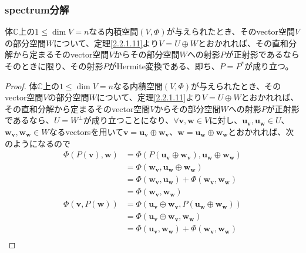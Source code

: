 \documentclass[dvipdfmx]{jsarticle}
\begin{document}
\subsubsection{spectrum分解}%
\begin{thm}\label{2.3.9.7}
体$\mathbb{C}$上の$1 \leq \dim V = n$なる内積空間$(V,\varPhi)$が与えられたとき、そのvector空間$V$の部分空間$W$について、定理\ref{2.2.1.11}より$V = U \oplus W$とおかれれば、その直和分解から定まるそのvector空間$V$からその部分空間$W$への射影$P$が正射影であるならそのときに限り、その射影$P$がHermite変換である、即ち、$P = P^{*}$が成り立つ。
\end{thm}
\begin{proof}
体$\mathbb{C}$上の$1 \leq \dim V = n$なる内積空間$(V,\varPhi)$が与えられたとき、そのvector空間$V$の部分空間$W$について、定理\ref{2.2.1.11}より$V = U \oplus W$とおかれれば、その直和分解から定まるそのvector空間$V$からその部分空間$W$への射影$P$が正射影であるなら、$U = W^{\bot}$が成り立つことになり、$\forall\mathbf{v},\mathbf{w} \in V$に対し、$\mathbf{u}_{\mathbf{v}},\mathbf{u}_{\mathbf{w}} \in U$、$\mathbf{w}_{\mathbf{v}},\mathbf{w}_{\mathbf{w}} \in W$なるvectorsを用いて$\mathbf{v} = \mathbf{u}_{\mathbf{v}} \oplus \mathbf{w}_{\mathbf{v}}$、$\mathbf{w} = \mathbf{u}_{\mathbf{w}} \oplus \mathbf{w}_{\mathbf{w}}$とおかれれば、次のようになるので
\begin{align*}
\varPhi\left( P\left( \mathbf{v} \right),\mathbf{w} \right) &= \varPhi\left( P\left( \mathbf{u}_{\mathbf{v}} \oplus \mathbf{w}_{\mathbf{v}} \right),\mathbf{u}_{\mathbf{w}} \oplus \mathbf{w}_{\mathbf{w}} \right)\\
&= \varPhi\left( \mathbf{w}_{\mathbf{v}},\mathbf{u}_{\mathbf{w}} \oplus \mathbf{w}_{\mathbf{w}} \right)\\
&= \varPhi\left( \mathbf{w}_{\mathbf{v}},\mathbf{u}_{\mathbf{w}} \right) + \varPhi\left( \mathbf{w}_{\mathbf{v}},\mathbf{w}_{\mathbf{w}} \right)\\
&= \varPhi\left( \mathbf{w}_{\mathbf{v}},\mathbf{w}_{\mathbf{w}} \right)\\
\varPhi\left( \mathbf{v},P\left( \mathbf{w} \right) \right) &= \varPhi\left( \mathbf{u}_{\mathbf{v}} \oplus \mathbf{w}_{\mathbf{v}},P\left( \mathbf{u}_{\mathbf{w}} \oplus \mathbf{w}_{\mathbf{w}} \right) \right)\\
&= \varPhi\left( \mathbf{u}_{\mathbf{v}} \oplus \mathbf{w}_{\mathbf{v}},\mathbf{w}_{\mathbf{w}} \right)\\
&= \varPhi\left( \mathbf{u}_{\mathbf{v}},\mathbf{w}_{\mathbf{w}} \right) + \varPhi\left( \mathbf{w}_{\mathbf{v}},\mathbf{w}_{\mathbf{w}} \right)\\

\end{align*}
\end{proof}
\end{document}
